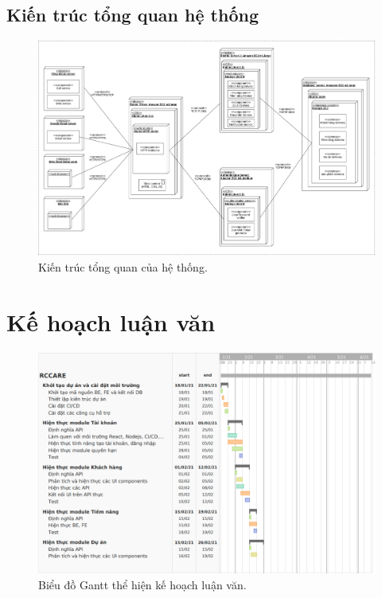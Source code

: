 \documentclass[12pt,a4paper]{article}
\begin{document}
    \subsection{Kiến trúc tổng quan hệ thống}

    \begin{figure}
        \includegraphics[width=\textwidth]{Img/Architecture/All.png}
        \caption{Kiến trúc tổng quan của hệ thống.}
        \label{fig:Architecture}
    \end{figure}

    \newpage


    \section{Kế hoạch luận văn}

    \begin{figure}
        \includegraphics[width=\textwidth]{Img/KeHoachLV/1.png}
        \caption{Biểu đồ Gantt thể hiện kế hoạch luận văn.}
        \label{fig:Architecture}
    \end{figure}
\end{document}
